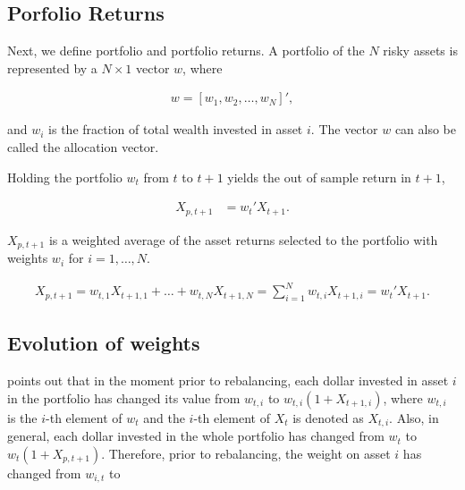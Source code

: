 \documentclass[12pt,oneside,a4paper]{memoir}
\begin{document}
\subsection*{Porfolio Returns}

Next, we define portfolio and portfolio returns.
A portfolio of the $N$ risky assets is represented by a $N\times 1$ vector $w$, where

\vspace{-18 pt}
\begin{align*}
	w = \left[ w_1, w_2 , \dots, w_N \right]',
\end{align*}

\noindent
and $w_{i}$ is the fraction of total wealth invested in asset $i$.
The vector $w$ can also be called the allocation vector.

Holding the portfolio $w_{t}$ from $t$ to $t+1$ yields the out of sample return in $t+1$,

\vspace{-18 pt}
\begin{align} \label{eq:retport}
	X_{p,t+1} &= w_{t}'X_{t+1}.
\end{align}

\noindent
$X_{p,t+1}$ is a weighted average of the asset returns selected to the portfolio with weights $w_{i}$ for $i=1,\dots,N$.

\vspace{-18 pt}
\begin{align*} \label{ret_port}
	X_{p,t+1} =
	w_{t,1} X_{t+1,1} + \dots + w_{t,N} X_{t+1,N} =
	\sum_{i=1}^{N} w_{t,i} X_{t+1,i} = w_{t}'X_{t+1}.
\end{align*}

\subsection*{Evolution of weights}

 points out that in the moment prior to rebalancing, each dollar invested in asset $i$ in the portfolio has changed its value from $w_{t,i}$ to $w_{t,i}(1+X_{t+1,i})$, where $w_{t,i}$ is the $i$-th element of $w_{t}$ and the $i$-th element of $X_{t}$ is denoted as $X_{t,i}$.
Also, in general, each dollar invested in the whole portfolio has changed from $w_{t}$ to $w_{t}(1+X_{p,t+1})$.
Therefore, prior to rebalancing, the weight on asset $i$ has changed from $w_{i,t}$ to 
\end{document}

